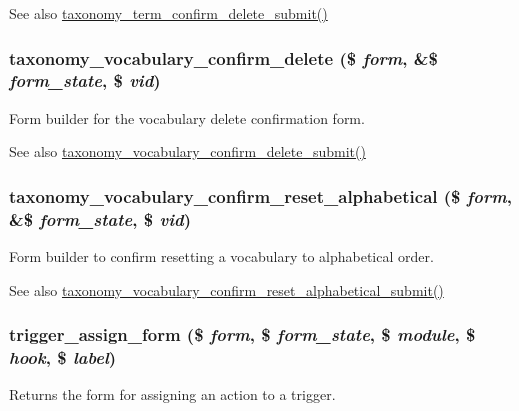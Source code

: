 \begin{DoxySeeAlso}{See also}
\hyperlink{taxonomy_8admin_8inc_ab96dee24a79d706b4b28d26ceac5e946}{taxonomy\_\-term\_\-confirm\_\-delete\_\-submit()} 
\end{DoxySeeAlso}
\hypertarget{group__forms_gaa1e0e524fc8e3642b059c8186a4cd4f8}{
\subsubsection[{taxonomy\_\-vocabulary\_\-confirm\_\-delete}]{\setlength{\rightskip}{0pt plus 5cm}taxonomy\_\-vocabulary\_\-confirm\_\-delete (\$ {\em form}, \/  \&\$ {\em form\_\-state}, \/  \$ {\em vid})}}
\label{group__forms_gaa1e0e524fc8e3642b059c8186a4cd4f8}
Form builder for the vocabulary delete confirmation form.

\begin{DoxySeeAlso}{See also}
\hyperlink{taxonomy_8admin_8inc_a37c587803cac8e509913d1374e897040}{taxonomy\_\-vocabulary\_\-confirm\_\-delete\_\-submit()} 
\end{DoxySeeAlso}
\hypertarget{group__forms_ga3af4162d583df90dc6511e82d25bf374}{
\subsubsection[{taxonomy\_\-vocabulary\_\-confirm\_\-reset\_\-alphabetical}]{\setlength{\rightskip}{0pt plus 5cm}taxonomy\_\-vocabulary\_\-confirm\_\-reset\_\-alphabetical (\$ {\em form}, \/  \&\$ {\em form\_\-state}, \/  \$ {\em vid})}}
\label{group__forms_ga3af4162d583df90dc6511e82d25bf374}
Form builder to confirm resetting a vocabulary to alphabetical order.

\begin{DoxySeeAlso}{See also}
\hyperlink{taxonomy_8admin_8inc_a682c533b8249e033ce7e612550c9b68d}{taxonomy\_\-vocabulary\_\-confirm\_\-reset\_\-alphabetical\_\-submit()} 
\end{DoxySeeAlso}
\hypertarget{group__forms_gab1bcec33dbc9ec1071f889662dfca03c}{
\subsubsection[{trigger\_\-assign\_\-form}]{\setlength{\rightskip}{0pt plus 5cm}trigger\_\-assign\_\-form (\$ {\em form}, \/  \$ {\em form\_\-state}, \/  \$ {\em module}, \/  \$ {\em hook}, \/  \$ {\em label})}}
\label{group__forms_gab1bcec33dbc9ec1071f889662dfca03c}
Returns the form for assigning an action to a trigger.


